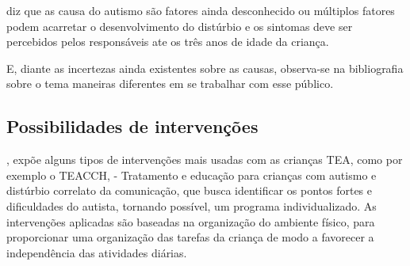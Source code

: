 		 diz que as causa do autismo são fatores ainda desconhecido ou múltiplos fatores podem acarretar o desenvolvimento do distúrbio e os sintomas deve ser percebidos pelos responsáveis ate os três anos de idade da criança.
		
		E, diante  as incertezas ainda existentes sobre as causas, observa-se na bibliografia sobre o tema maneiras diferentes em se trabalhar com esse público.  
		\subsection{Possibilidades de intervenções} \label{tratamentos}
		
		
		
		 , expõe alguns tipos de intervenções mais usadas com as crianças TEA, como  por exemplo o TEACCH, - Tratamento e educação para crianças com autismo e distúrbio correlato da comunicação, que busca identificar os pontos fortes e dificuldades do autista, tornando possível, um programa individualizado. As intervenções aplicadas são baseadas na organização do ambiente físico, para proporcionar uma organização das tarefas da criança de modo a favorecer a independência das atividades diárias.  

